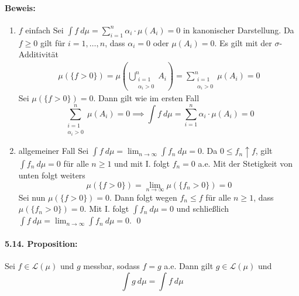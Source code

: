 \documentclass[12pt]{report}
\begin{document}
  \paragraph{Beweis:}
  \begin{enumerate}[label=\Roman*.]
      \item $f$ einfach\newline
      Sei $\displaystyle\int f\ d\mu=\sum_{i=1}^n\alpha_i\cdot\mu(A_i)=0$ in kanonischer Darstellung. Da $f\geq0$ gilt f\"ur $i=1,\hdots,n$, dass $\alpha_i=0$ oder $\mu(A_i)=0$. \goodbreak
      Es gilt mit der $\sigma$-Additivit\"at
      \begin{align*}
          \mu\left(\{f>0\}
          \right)=\mu\left(\bigcup_{\substack{i=1\\\alpha_i>0}}^n A_i\right)=\sum_{\substack{i=1\\ \alpha_i>0}}^n\mu(A_i)=0
      \end{align*}
      Sei $\mu(\{f>0\})=0$. Dann gilt wie im ersten Fall 
      $$\sum_{\substack{i=1\\ \alpha_i>0}}^n\mu(A_i)=0\implies\int f\ d\mu=\sum_{i=1}^n\alpha_i\cdot\mu(A_i)=0$$
      \item allgemeiner Fall\newline
      Sei $\displaystyle\int f\ d\mu=\lim_{n\to\infty}\int f_n\ d\mu=0$. Da $0\leq f_n\uparrow f$, gilt $\int f_n\ d\mu=0$ f\"ur alle $n\geq1$ und mit I. folgt $f_n=0$ a.e. Mit der Stetigkeit von unten folgt weiters
      $$\mu(\{f>0\})=\lim_{n\to\infty}\mu(\{f_n>0\})=0$$
      Sei nun $\mu(\{f>0\})=0$. Dann folgt wegen $f_n\leq f$ f\"ur alle $n\geq1$, dass $\mu(\{f_n>0\})=0$. Mit I. folgt $\displaystyle\int f_n\ d\mu=0$ und schlie\ss{}lich $\displaystyle\int f\ d\mu=\lim_{n\to\infty}\int f_n\ d\mu=0$. \qed
  \end{enumerate}
  
  \paragraph{5.14. Proposition:}Sei $f\in\mathcal{L}(\mu)$ und $g$ messbar, sodass $f=g$ a.e. Dann gilt $g\in\mathcal{L}(\mu)$ und
  $$\int g\ d\mu=\int f\ d\mu$$
  
\end{document}
